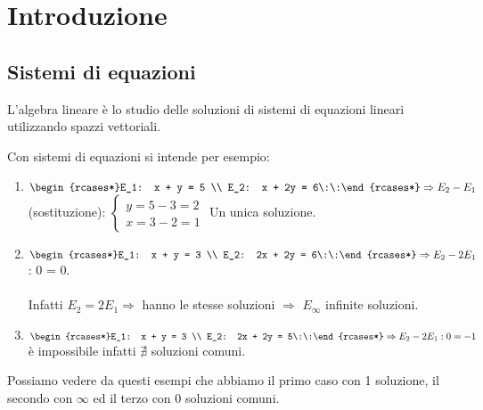 \section{Introduzione}
\subsection{Sistemi di equazioni}
L'algebra lineare è lo studio delle soluzioni di sistemi di equazioni lineari utilizzando spazzi vettoriali.
\begin{example}
Con sistemi di equazioni si intende per esempio:
\begin{enumerate}
    \item \hspace{.3cm} $\begin{rcases*}E_1: x + y = 5 \\ E_2: x + 2y = 6\:\:\end{rcases*} \Rightarrow E_2 - E_1$ (sostituzione): $\begin{cases}y = 5 - 3 = 2 \\ x = 3 - 2 = 1\end{cases}$ \hspace{.2cm} Un unica soluzione.
    \item \hspace{.3cm} $\begin{rcases*}E_1: x + y = 3 \\ E_2: 2x + 2y = 6\:\:\end{rcases*} \Rightarrow E_2 - 2E_1$: 0 = 0.\\\\
    Infatti $E_2 = 2E_1 \Rightarrow$ hanno le stesse soluzioni $\Rightarrow$ $E_{\infty}$ infinite soluzioni.
    \item \hspace{.3cm} $\begin{rcases*}E_1: x + y = 3 \\ E_2: 2x + 2y = 5\:\:\end{rcases*} \Rightarrow E_2 - 2E_1: 0 = -1$ è impossibile infatti $\nexists$ soluzioni comuni.
\end{enumerate}
Possiamo vedere da questi esempi che abbiamo il primo caso con 1 soluzione, il secondo con $\infty$ ed il terzo con 0 soluzioni comuni.
\end{example}

